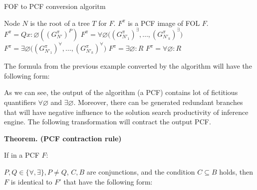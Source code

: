 \documentclass[a4paper,12pt]{article}
\begin{document}
\renewcommand{\algorithmicrequire}{\textbf{Input:}}
\renewcommand{\algorithmicensure}{\textbf{Output:}}
\begin{algorithm}
\caption{FOF to PCF conversion algoritm}\label{alg:conv}
\begin{algorithmic}
\REQUIRE Node $N$ is the root of a tree $T$ for $F$.
\ENSURE $F^{\pi}$ is a PCF image of FOL $F$.
  \RETURN  $F^{\pi} = Qx\colon\varnothing ( (G_{N'}^{\pi})^{P} )$   
\ENDIF
{}
  \RETURN  $F^{\pi} = \forall\varnothing \bigl( (G_{N'_1}^{\pi})^{\exists},\ldots,(G_{N'_k}^{\pi})^{\exists}\bigr)$
\ENDIF
{}
  \RETURN  $F^{\pi} = \exists\varnothing \bigl( (G_{N'_1}^{\pi})^{\forall},\ldots,(G_{N'_k}^{\pi})^{\forall}\bigr)$
\ENDIF
{}
  \RETURN  $F^{\pi} = \exists\varnothing\colon R$
\ENDIF
{}
  \RETURN  $F^{\pi} = \forall\varnothing\colon R$
\ENDIF
\end{algorithmic}
\end{algorithm}

The formula from the previous example converted by the algorithm will have the following form:
\begin{center}
\end{center}

As we can see, the output of the algorithm (a PCF) contains lot of fictitious quantifiers   $\forall\varnothing$ and $\exists\varnothing$.  Moreover, there can be generated redundant branches that will have negative influence to the solution search productivity of inference engine.  The following transformation will contract the output PCF.

\textbf{Theorem. (PCF contraction rule)}

If in a PCF $F$:
\begin{center}
\end{center}
$P,Q\in\{\forall,\exists\}, P\neq Q$, $C,B$ are conjunctions, and the condition $C\subseteq B$ holds, then $F$ is identical to $F'$ that have the following form:
\end{document}
